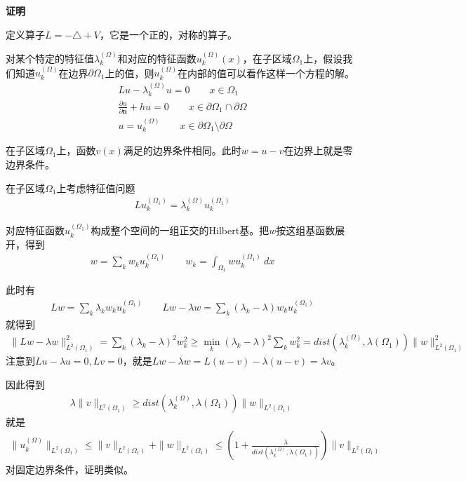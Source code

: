 \documentclass[12pt,a4paper]{article}
\begin{document}
\textbf{证明}

定义算子$L = -\triangle + V$，它是一个正的，对称的算子。

对某个特定的特征值$\lambda_k^{(\Omega)}$和对应的特征函数$u_k^{(\Omega)}(x)$，在子区域$\Omega_1$上，假设我们知道$u_k^{(\Omega)}$在边界$\partial \Omega_1$上的值，则$u_k^{(\Omega)}$在内部的值可以看作这样一个方程的解。
\begin{align}
L u - \lambda_k^{(\Omega)} u = 0 \qquad x \in \Omega_1 \\
\frac{\partial u}{\partial \mathbf{n}} + h u = 0 \qquad x \in \partial \Omega_1 \cap \partial \Omega \\
u = u_k^{(\Omega)} \qquad x \in \partial \Omega_1 \setminus \partial \Omega
\end{align}

在子区域$\Omega_1$上，函数$v(x)$满足的边界条件相同。此时$w = u - v$在边界上就是零边界条件。

在子区域$\Omega_1$上考虑特征值问题
\begin{align}
L u_k^{(\Omega_1)} = \lambda_k^{(\Omega)} u_k^{(\Omega_1)}
\end{align}

对应特征函数$u_k^{(\Omega_1)}$构成整个空间的一组正交的Hilbert基。把$w$按这组基函数展开，得到
\begin{align}
w = \sum_k w_k u_k^{(\Omega_1)} \qquad w_k = \int_{\Omega_1} w u_k^{(\Omega_1)} \ dx
\end{align}

此时有
\begin{align}
L w = \sum_k \lambda_k w_k u_k^{(\Omega_1)} \qquad L w - \lambda w = \sum_k (\lambda_k - \lambda) w_k u_k^{(\Omega_1)}
\end{align}
就得到
\begin{align}\label{eq0}
\| L w - \lambda w \|_{L^2(\Omega_1)}^2 = \sum_k (\lambda_k - \lambda)^2 w_k^2 \geq \min_k (\lambda_k - \lambda)^2\sum_k w_k^2 = dist(\lambda_k^{(\Omega)}, \lambda(\Omega_1)) \|w\|_{L^2(\Omega_1)}^2
\end{align}
注意到$L u - \lambda u = 0, L v = 0$，就是$L w - \lambda w = L(u - v) - \lambda(u - v) = \lambda v$。

因此得到
\begin{align}
\lambda \| v \|_{L^2(\Omega_1)} \geq dist(\lambda_k^{(\Omega)}, \lambda(\Omega_1)) \|w\|_{L^2(\Omega_1)}
\end{align}
就是
\begin{align}
\|u_k^{(\Omega)}\|_{L^2(\Omega_1)} \leq \|v\|_{L^2(\Omega_1)} + \|w\|_{L^2(\Omega_1)} \leq (1 + \frac{\lambda}{dist(\lambda_k^{(\Omega)}, \lambda(\Omega_1))}) \|v\|_{L^2(\Omega_1)}
\end{align}
对固定边界条件，证明类似。
\end{document}
